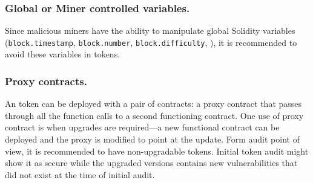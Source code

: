 \subsubsection{Global or Miner controlled variables.}

Since malicious miners have the ability to manipulate global Solidity variables (\eg \texttt{block.timestamp}, \linebreak\texttt{block.number}, \texttt{block.difficulty}, \etc), it is recommended to avoid these variables in \erc tokens.

\subsubsection{Proxy contracts.}

An \erc token can be deployed with a pair of contracts: a proxy contract that passes through all the function calls to a second functioning \erc contract\cite{ProxyContract,ProxyPatterns}. One use of proxy contract is when upgrades are required---a new functional contract can be deployed and the proxy is modified to point at the update. Form audit point of view, it is recommended to have non-upgradable \erc tokens. Initial token audit might show it as secure while the upgraded versions contains new vulnerabilities that did not exist at the time of initial audit.

